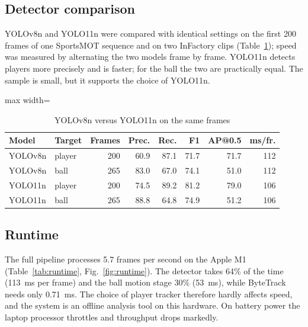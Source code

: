 \documentclass[conference]{IEEEtran}
\begin{document}
\subsection{Detector comparison}
YOLOv8n and YOLO11n were compared with identical settings on the first 200
frames of one SportsMOT sequence and on two InFactory clips
(Table~\ref{tab:models}); speed was measured by alternating the two models frame
by frame. YOLO11n detects players more precisely and is faster; for the ball the
two are practically equal. The sample is small, but it supports the choice of
YOLO11n.

\begin{table}[!htb]
\caption{YOLOv8n versus YOLO11n on the same frames}
\label{tab:models}
\centering
\footnotesize
\begin{adjustbox}{max width=\columnwidth}
\begin{tabular}{@{}llrrrrrr@{}}
\toprule
Model & Target & Frames & Prec. & Rec. & F1 & AP@0.5 & ms/fr. \\
\midrule
YOLOv8n & player & 200 & 60.9 & 87.1 & 71.7 & 71.7 & 112 \\
YOLOv8n & ball & 265 & 83.0 & 67.0 & 74.1 & 51.0 & 112 \\
YOLO11n & player & 200 & 74.5 & 89.2 & 81.2 & 79.0 & 106 \\
YOLO11n & ball & 265 & 88.8 & 64.8 & 74.9 & 51.2 & 106 \\
\bottomrule
\end{tabular}
\end{adjustbox}
\end{table}

\subsection{Runtime}
The full pipeline processes 5.7 frames per second on the Apple M1
(Table~\ref{tab:runtime}, Fig.~\ref{fig:runtime}). The detector takes
64\% of the time (113~ms per frame) and the ball motion
stage 30\% (53~ms), while ByteTrack needs only
0.71~ms. The choice of player tracker therefore hardly affects speed,
and the system is an offline analysis tool on this hardware. On battery power
the laptop processor throttles and throughput drops markedly.
\end{document}
